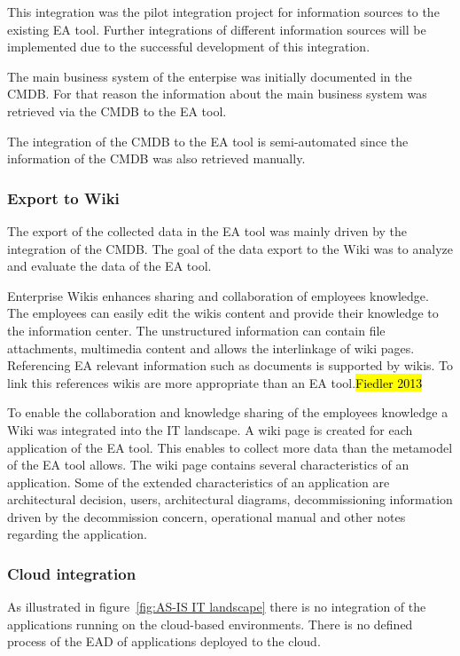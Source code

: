 This integration was the pilot integration project for information sources to the existing EA tool. Further integrations of different information sources will be implemented due to the successful development of this integration.

The main business system of the enterpise was initially documented in the CMDB. For that reason the information about the main business system was retrieved via the CMDB to the EA tool.

The integration of the CMDB to the EA tool is semi-automated since the information of the CMDB was also retrieved manually.

\subsubsection{Export to Wiki}

The export of the collected data in the EA tool was mainly driven by the integration of the CMDB. The goal of the data export to the Wiki was to analyze and evaluate the data of the EA tool. 

Enterprise Wikis enhances sharing and collaboration of employees knowledge. The employees can easily edit the wikis content and provide their knowledge to the information center. The unstructured information can contain file attachments, multimedia content and allows the interlinkage of wiki pages. Referencing EA relevant information such as documents is supported by wikis. To link this references wikis are more appropriate than an EA tool.\hl{Fiedler 2013}

To enable the collaboration and knowledge sharing of the employees knowledge a Wiki was integrated into the IT landscape. A wiki page is created for each application of the EA tool. This enables to collect more data than the metamodel of the EA tool allows. The wiki page contains several characteristics of an application. Some of the extended characteristics of an application are architectural decision, users, architectural diagrams, decommissioning information driven by the decommission concern, operational manual and other notes regarding the application.

\subsubsection{Cloud integration}

As illustrated in figure~\ref{fig:AS-IS IT landscape} there is no integration of the applications running on the cloud-based environments. There is no defined process of the EAD of applications deployed to the cloud.


